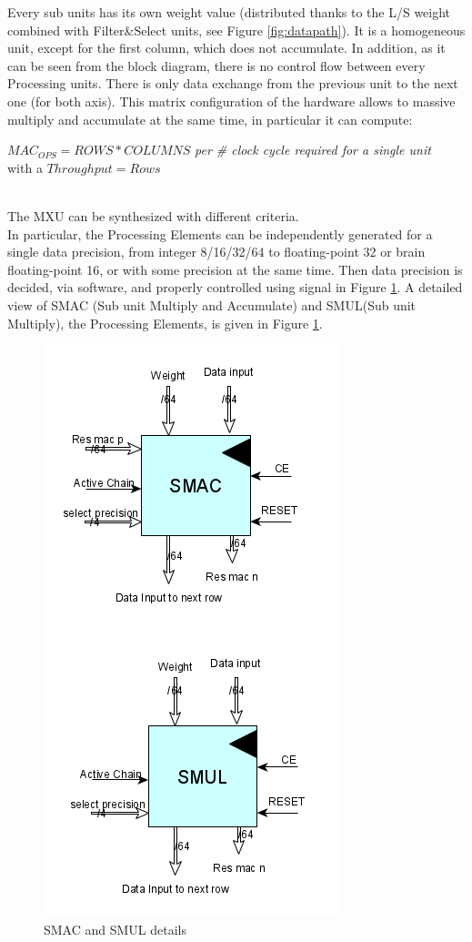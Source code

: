 Every sub units has its own weight value (distributed thanks to the L/S weight combined with Filter\&Select units, see Figure \ref{fig:datapath}). It is a homogeneous unit, except for the first column, which does not accumulate. In addition, as it can be seen from the block diagram, there is no control flow between every Processing units. There is only data exchange from the previous unit to the next one (for both axis). This matrix configuration of the hardware allows to massive multiply and accumulate at the same time, in particular it can compute:\\
\begin{center}
$MAC_{OPS}= ROWS*COLUMNS $ \textit{per \# clock cycle required for a single unit}\\ with a $Throughput=Rows$
\end{center}
\ \\
The MXU can be synthesized with different criteria.\\ In particular, the Processing Elements can be independently generated for a single data precision, from integer 8/16/32/64 to floating-point 32 or brain floating-point 16, or with some precision at the same time. Then data precision is decided, via software, and properly controlled using signal in Figure \ref{fig:smac}.
\newpage
A detailed view of SMAC (Sub unit Multiply and Accumulate) and SMUL(Sub unit Multiply), the Processing Elements, is given in Figure \ref{fig:smac}.
\begin{figure}[H]
\centering
\captionsetup{justification=centering}
\includegraphics[scale=0.45,angle=0]{./figure/smac.png}
\caption{SMAC and SMUL details}
\label{fig:smac}
\end{figure} 

